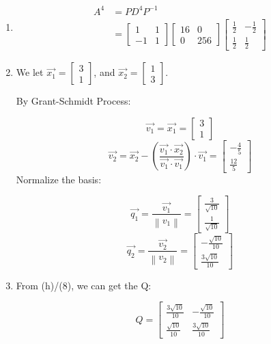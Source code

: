\documentclass[11pt]{article} %
\newcommand{\norm}[1]{\left\lVert#1\right\rVert}
\begin{document}
\begin{enumerate}
\item 
\begin{align*}
A^4&=PD^4P^{-1}\\
&=\begin{bmatrix}
	1&1\\-1&1
\end{bmatrix}\begin{bmatrix}
16&0\\0&256
\end{bmatrix}\begin{bmatrix}
\frac{1}{2}&-\frac{1}{2}\\\frac{1}{2}&\frac{1}{2}
\end{bmatrix}
\end{align*}

\item We let $\vec{x_1}=\begin{bmatrix}
	3\\1
\end{bmatrix}$, and $\vec{x_2}=\begin{bmatrix}
1\\3
\end{bmatrix}$. 

By Grant-Schmidt Process:

$$\vec{v_1}=\vec{x_1}=\begin{bmatrix}
	3\\1
\end{bmatrix}$$
$$\vec{v_2}=\vec{x_2}-(\frac{\vec{v_1}\cdot \vec{x_2}}{\vec{v_1}\cdot \vec{v_1}})\cdot \vec{v_1}=\begin{bmatrix}
	-\frac{4}{5}\\\frac{12}{5}
\end{bmatrix}$$
Normalize the basis:

$$\vec{q_1}=\frac{\vec{v_1}}{\norm{v_1}}=\begin{bmatrix}
	\frac{3}{\sqrt{10}}\\
	\frac{1}{\sqrt{10}}
\end{bmatrix}$$
$$\vec{q_2}=\frac{\vec{v_2}}{\norm{v_2}}=\begin{bmatrix}
	-\frac{\sqrt{10}}{10}\\\frac{3\sqrt{10}}{10}
\end{bmatrix}$$

\item 
From (h)/(8), we can get the Q:

$$Q=\begin{bmatrix}
	\frac{3\sqrt{10}}{10}&-\frac{\sqrt{10}}{10}\\
	\frac{\sqrt{10}}{10}&\frac{3\sqrt{10}}{10}
\end{bmatrix}$$


\end{enumerate}
\end{document}
